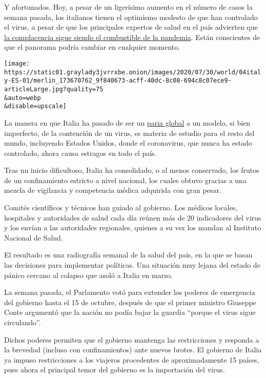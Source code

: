 Y afortunados. Hoy, a pesar de un ligerísimo aumento en el número de
casos la semana pasada, los italianos tienen el optimismo modesto de que
han controlado el virus, a pesar de que los principales expertos de
salud en el país advierten que
\href{https://www.nytimes3xbfgragh.onion/es/2020/07/21/espanol/mundo/errores-europa-coronavirus.html}{la
complacencia sigue siendo el combustible de la pandemia}. Están
conscientes de que el panorama podría cambiar en cualquier momento.

\texttt{[image: https://static01.graylady3jvrrxbe.onion/images/2020/07/30/world/04italy-ES-01/merlin\_173670762\_9f840673-acff-40dc-8c08-694c8c07ece9-articleLarge.jpg?quality=75\\\&auto=webp\\\&disable=upscale]}

La manera en que Italia ha pasado de ser un
\href{https://www.nytimes3xbfgragh.onion/es/2020/03/22/espanol/coronavirus-lecciones-italia.html}{paria
global} a un modelo, si bien imperfecto, de la contención de un virus,
es materia de estudio para el resto del mundo, incluyendo Estados
Unidos, donde el coronavirus, que nunca ha estado controlado, ahora
causa estragos en todo el país.

Tras un inicio dificultoso, Italia ha consolidado, o al menos
conservado, los frutos de un confinamiento estricto a nivel nacional,
los cuales obtuvo gracias a una mezcla de vigilancia y competencia
médica adquirida con gran pesar.

Comités científicos y técnicos han guiado al gobierno. Los médicos
locales, hospitales y autoridades de salud cada día reúnen más de 20
indicadores del virus y los envían a las autoridades regionales, quienes
a su vez los mandan al Instituto Nacional de Salud.

El resultado es una radiografía semanal de la salud del país, en la que
se basan las decisiones para implementar políticas. Una situación muy
lejana del estado de pánico cercano al colapso que asoló a Italia en
marzo.

La semana pasada, el Parlamento votó para extender los poderes de
emergencia del gobierno hasta el 15 de octubre, después de que el primer
ministro Giuseppe Conte argumentó que la nación no podía bajar la
guardia ``porque el virus sigue circulando''.

Dichos poderes permiten que el gobierno mantenga las restricciones y
responda a la brevedad (incluso con confinamientos) ante nuevos brotes.
El gobierno de Italia ya impuso restricciones a los viajeros procedentes
de aproximadamente 15 países, pues ahora el principal temor del gobierno
es la importación del virus.

